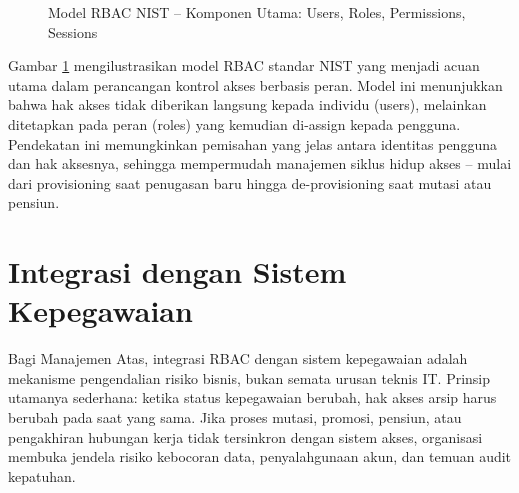 \documentclass[12pt,a4paper]{report}
\begin{document}
\begin{figure}[htbp]
\centering
{}%
\caption{Model RBAC NIST -- Komponen Utama: Users, Roles, Permissions, Sessions}
\label{fig:rbac-nist-model}
\end{figure}

\small Gambar \ref{fig:rbac-nist-model} mengilustrasikan model RBAC standar NIST yang menjadi acuan utama dalam perancangan kontrol akses berbasis peran. Model ini menunjukkan bahwa hak akses tidak diberikan langsung kepada individu (users), melainkan ditetapkan pada peran (roles) yang kemudian di-assign kepada pengguna. Pendekatan ini memungkinkan pemisahan yang jelas antara identitas pengguna dan hak aksesnya, sehingga mempermudah manajemen siklus hidup akses -- mulai dari provisioning saat penugasan baru hingga de-provisioning saat mutasi atau pensiun.

\section{Integrasi dengan Sistem Kepegawaian}
Bagi Manajemen Atas, integrasi RBAC dengan sistem kepegawaian adalah mekanisme pengendalian risiko bisnis, bukan semata urusan teknis IT. Prinsip utamanya sederhana: ketika status kepegawaian berubah, hak akses arsip harus berubah pada saat yang sama. Jika proses mutasi, promosi, pensiun, atau pengakhiran hubungan kerja tidak tersinkron dengan sistem akses, organisasi membuka jendela risiko kebocoran data, penyalahgunaan akun, dan temuan audit kepatuhan.
\end{document}
